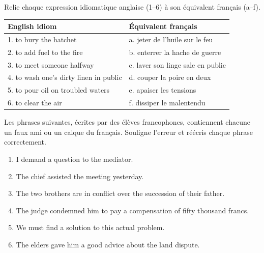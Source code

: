 \documentclass[11pt]{article}
\newcounter{popsec}
\newcounter{popsub}
\newcommand{\courssub}[1]{%
  \stepcounter{popsub}%
  \par\vspace{9pt}\noindent{\popxbold\fontsize{11.5}{13}\selectfont\color{popink}{\color{poporange}\thepopsec.\thepopsub}\hspace{6pt}#1}\par\nopagebreak\vspace{4pt}
}
\begin{document}
\begin{exercice}
Relie chaque expression idiomatique anglaise (1--6) à son équivalent français (a--f).

\begin{center}
\begin{tabularx}{\linewidth}{|X|X|}
\hline
\rowcolor{popblueL} \textbf{English idiom} & \textbf{Équivalent français} \\
\hline
1. to bury the hatchet & a. jeter de l'huile sur le feu \\
\hline
2. to add fuel to the fire & b. enterrer la hache de guerre \\
\hline
3. to meet someone halfway & c. laver son linge sale en public \\
\hline
4. to wash one's dirty linen in public & d. couper la poire en deux \\
\hline
5. to pour oil on troubled waters & e. apaiser les tensions \\
\hline
6. to clear the air & f. dissiper le malentendu \\
\hline
\end{tabularx}
\end{center}
\end{exercice}

\begin{exercice}
Les phrases suivantes, écrites par des élèves francophones, contiennent chacune un faux ami ou un calque du français. Souligne l'erreur et réécris chaque phrase correctement.

\begin{enumerate}
\item I demand a question to the mediator.
\item The chief assisted the meeting yesterday.
\item The two brothers are in conflict over the succession of their father.
\item The judge condemned him to pay a compensation of fifty thousand francs.
\item We must find a solution to this actual problem.
\item The elders gave him a good advice about the land dispute.
\end{enumerate}
\end{exercice}

\courssub{Je me prépare au Bac}
\end{document}
